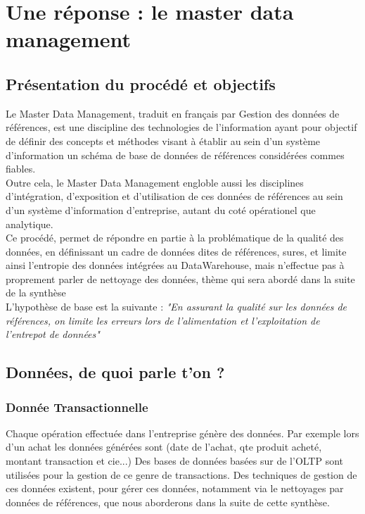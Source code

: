 \section{Une réponse : le master data management}

\subsection{Présentation du procédé et objectifs} 

Le Master Data Management, traduit en français par Gestion des données de références, est une discipline des technologies de l'information ayant pour objectif de définir des concepts et méthodes visant à établir au sein d'un système d'information un schéma de base de données de références considérées commes fiables.\\
Outre cela, le Master Data Management engloble aussi les disciplines d'intégration, d'exposition et d'utilisation de ces données de références au sein d'un système d'information d'entreprise, autant du coté opérationel que analytique.\\
Ce procédé, permet de répondre en partie à la problématique de la qualité des données, en définissant un cadre de données dites de références, sures, et limite ainsi l'entropie des données intégrées au DataWarehouse, mais n'effectue pas à proprement parler de nettoyage des données, thème qui sera abordé dans la suite de la synthèse\\

L'hypothèse de base est la suivante : \textit{"En assurant la qualité sur les données de références, on limite les erreurs lors de l'alimentation et l'exploitation de l'entrepot de données"}\\

\subsection{Données, de quoi parle t'on ?}

\subsubsection{Donnée Transactionnelle}

Chaque opération effectuée dans l'entreprise génère des données. Par exemple lors d'un achat
les données générées sont (date de l'achat, qte produit acheté, montant transaction et cie...)
Des bases de données basées sur de l'OLTP sont utilisées pour la gestion de ce genre de transactions.
Des techniques de gestion de ces données existent, pour gérer ces données, notamment via le nettoyages par données de références, que nous aborderons dans la suite de cette synthèse.

